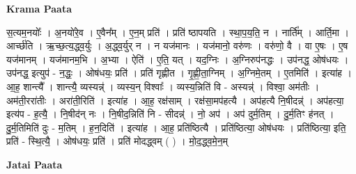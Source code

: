\documentclass[17pt]{extarticle}
\begin{document}
\textbf{Krama Paata} \newline

स॒त्यम॒नयोः᳚ । अ॒नयो॑रे॒व । ए॒वैन᳚म् । ए॒न॒म् प्रति॑ । प्रति॑ ष्ठापयति । स्था॒प॒य॒ति॒ न । नार्ति᳚म् । आर्ति॒मा । आर्च्छ॑ति । ऋ॒च्छ॒त्य॒द्ध्व॒र्युः । अ॒द्ध्व॒र्युर् न । न यज॑मानः । यज॑मानो॒ वरु॑णः । वरु॑णो॒ वै । वा ए॒षः । ए॒ष यज॑मानम् । यज॑मानम॒भि । अ॒भ्या । ऐति॑ । ए॒ति॒ यत् । यद॒ग्निः । अ॒ग्निरुप॑नद्धः । उप॑नद्ध॒ ओष॑धयः । उप॑नद्ध॒ इत्युप॑ - न॒द्धः॒ । ओष॑धयः॒ प्रति॑ । प्रति॑ गृह्णीत । गृ॒ह्णी॒ता॒ग्निम् । अ॒ग्निमे॒तम् । ए॒तमिति॑ । इत्या॑ह । आ॒ह॒ शान्त्यै᳚ । शान्त्यै॒ व्यस्यन्न्॑ । व्यस्य॒न् विश्वाः᳚ । व्यस्य॒न्निति॑ वि - अस्यन्न्॑ । विश्वा॒ अम॑तीः । अम॑ती॒ररा॑तीः । अरा॑ती॒रिति॑ । इत्या॑ह । आ॒ह॒ रक्ष॑साम् । रक्ष॑सा॒मप॑हत्यै । अप॑हत्यै नि॒षीदन्न्॑ । अप॑हत्या॒ इत्य॑प - ह॒त्यै॒ । नि॒षीद॑न् नः । नि॒षीद॒न्निति॑ नि - सीदन्न्॑ । नो॒ अप॑ । अप॑ दुर्म॒तिम् । दु॒र्म॒तिꣳ ह॑नत् । दु॒र्म॒तिमिति॑ दुः - म॒तिम् । ह॒न॒दिति॑ । इत्या॑ह । आ॒ह॒ प्रति॑ष्ठित्यै । प्रति॑ष्ठित्या॒ ओष॑धयः । प्रति॑ष्ठित्या॒ इति॒ प्रति॑ - स्थि॒त्यै॒ । ओष॑धयः॒ प्रति॑ । प्रति॑ मोदद्ध्वम् ( ) । मो॒द॒द्ध्व॒मे॒न॒म् \newline

\textbf{Jatai Paata} \newline
\end{document}
